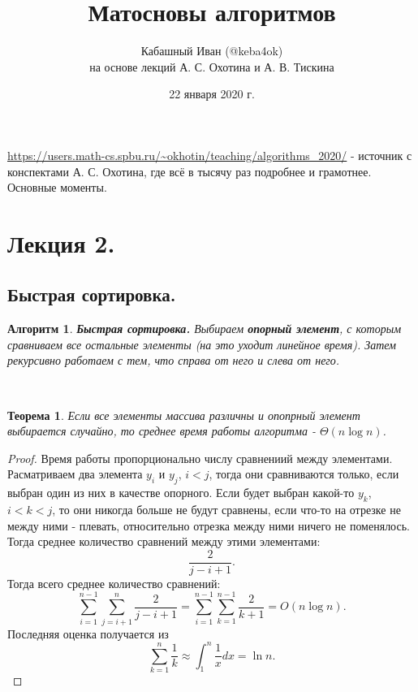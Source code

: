\documentclass[a4paper]{article}
\title{Матосновы алгоритмов}
\author{Кабашный Иван (@keba4ok) \\ на основе лекций А. С. Охотина и А. В. Тискина}
\date{22 января 2020 г.}
\theoremstyle{indented}
\newtheorem{theorem}{Теорема}
\newtheorem{alg}{Алгоритм}
\theoremstyle{definition}
\theoremstyle{remark}
\begin{document}
\newcommand{\resetexlcounters}{%
  \setcounter{exl}{0}%
} 

\newcommand{\resetremarkcounters}{%
  \setcounter{remark}{0}%
} 

\newcommand{\reseconscounters}{%
  \setcounter{cons}{0}%
} 

\newcommand{\resetall}{%
    \resetexlcounters
    \resetremarkcounters
    \reseconscounters%
}

\maketitle 

\newpage

\url{https://users.math-cs.spbu.ru/~okhotin/teaching/algorithms_2020/} - источник с конспектами А. С. Охотина, где всё в тысячу раз подробнее и грамотнее. \\

\hypertarget{t1}{Основные моменты}. 
\tableofcontents

\newpage

\section{Лекция 2.}

\subsection{Быстрая сортировка.}

\begin{alg}
    \textbf{Быстрая сортировка.} Выбираем \textbf{опорный элемент}, с которым сравниваем все остальные элементы (на это уходит линейное время). Затем рекурсивно работаем с тем, что справа от него и слева от него.
\end{alg} \ 

\begin{theorem}
    Если все элементы массива различны и опопрный элемент выбирается случайно, то среднее время работы алгоритма - $\Theta(n\log n)$.
\end{theorem}

\begin{proof}
    Время работы пропорционально числу сравнениий между элементами. Расматриваем два элемента $y_i$ и $y_j$, $i<j$, тогда они сравниваются только, если выбран один из них в качестве опорного. Если будет выбран какой-то $y_k$, $i<k<j$, то они никогда больше не будут сравнены, если что-то на отрезке не между ними - плевать, относительно отрезка между ними ничего не поменялось. Тогда среднее количество сравнений между этими элементами: 
    \[
        \frac{2}{j-i+1}. 
    \]
    Тогда всего среднее количество сравнений: 
    \[
        \sum_{i=1}^{n-1}\sum_{j=i+1}^n \frac{2}{j-i+1} = \sum_{i=1}^{n-1}\sum_{k=1}^{n-1} \frac{2}{k+1}= O(n\log n).
    \]
    Последняя оценка получается из
    \[
        \sum_{k=1}^n\frac{1}{k} \approx \int_1^n \frac{1}{x}dx = \ln n. 
    \]
\end{proof}
\end{document}
